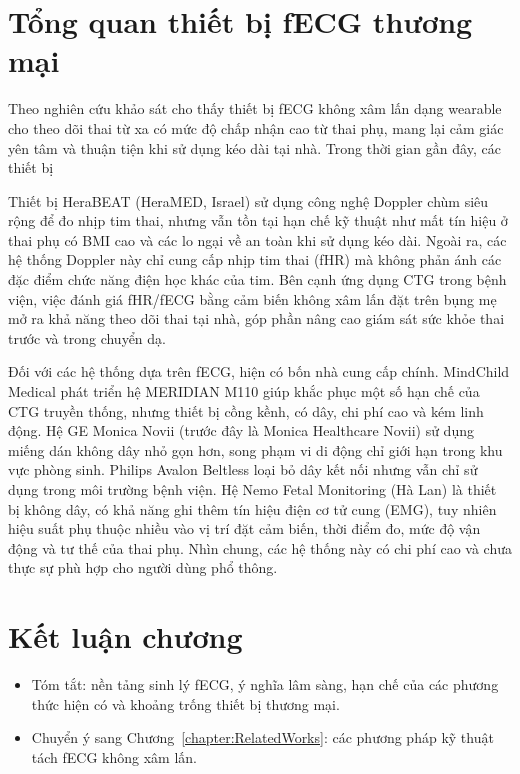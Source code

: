 \documentclass[../DoAn.tex]{subfiles}
\begin{document}
\section{Tổng quan thiết bị fECG thương mại}

Theo nghiên cứu khảo sát \cite{karmakarConsumerInsightsFeasibility2025} cho thấy thiết bị fECG không xâm lấn dạng wearable cho theo dõi thai từ xa có mức độ chấp nhận cao từ thai phụ, mang lại cảm giác yên tâm và thuận tiện khi sử dụng kéo dài tại nhà. Trong thời gian gần đây, các thiết bị

Thiết bị HeraBEAT (HeraMED, Israel) sử dụng công nghệ Doppler chùm siêu rộng để đo nhịp tim thai, nhưng vẫn tồn tại hạn chế kỹ thuật như mất tín hiệu ở thai phụ có BMI cao và các lo ngại về an toàn khi sử dụng kéo dài. Ngoài ra, các hệ thống Doppler này chỉ cung cấp nhịp tim thai (fHR) mà không phản ánh các đặc điểm chức năng điện học khác của tim. Bên cạnh ứng dụng CTG trong bệnh viện, việc đánh giá fHR/fECG bằng cảm biến không xâm lấn đặt trên bụng mẹ mở ra khả năng theo dõi thai tại nhà, góp phần nâng cao giám sát sức khỏe thai trước và trong chuyển dạ.

Đối với các hệ thống dựa trên fECG, hiện có bốn nhà cung cấp chính. MindChild Medical phát triển hệ MERIDIAN M110 giúp khắc phục một số hạn chế của CTG truyền thống, nhưng thiết bị cồng kềnh, có dây, chi phí cao và kém linh động. Hệ GE Monica Novii (trước đây là Monica Healthcare Novii) sử dụng miếng dán không dây nhỏ gọn hơn, song phạm vi di động chỉ giới hạn trong khu vực phòng sinh. Philips Avalon Beltless loại bỏ dây kết nối nhưng vẫn chỉ sử dụng trong môi trường bệnh viện. Hệ Nemo Fetal Monitoring (Hà Lan) là thiết bị không dây, có khả năng ghi thêm tín hiệu điện cơ tử cung (EMG), tuy nhiên hiệu suất phụ thuộc nhiều vào vị trí đặt cảm biến, thời điểm đo, mức độ vận động và tư thế của thai phụ. Nhìn chung, các hệ thống này có chi phí cao và chưa thực sự phù hợp cho người dùng phổ thông.

\section{Kết luận chương}
\begin{itemize}
  \item Tóm tắt: nền tảng sinh lý fECG, ý nghĩa lâm sàng, hạn chế của các phương thức hiện có và khoảng trống thiết bị thương mại.
  \item Chuyển ý sang Chương~\ref{chapter:RelatedWorks}: các phương pháp kỹ thuật tách fECG không xâm lấn.
\end{itemize}
\end{document}
